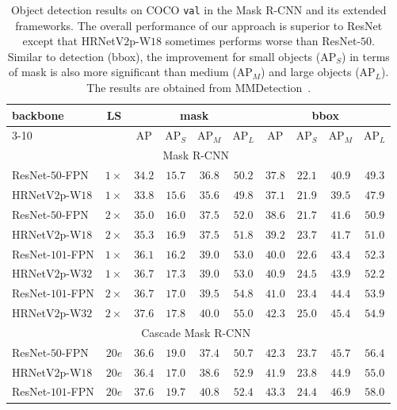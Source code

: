 \documentclass[10pt,journal,compsoc]{IEEEtran}
\begin{document}
\renewcommand{\arraystretch}{1.3}
	\begin{table}[t]
	\setlength{\tabcolsep}{2.3pt}
	\centering
	\caption{
	Object detection results on COCO \texttt{val}
	in the Mask R-CNN and its extended frameworks.
	{
	The overall performance 
	of our approach is superior to 
	ResNet except that
	HRNetV$2$p-W$18$ sometimes performs worse than ResNet-$50$.
	Similar to detection (bbox), 
	the improvement for small objects (AP$_S$) in terms of mask
	is also more significant than medium
	(AP$_M$)
	and large objects (AP$_L$).}
	The results are obtained from MMDetection~\cite{mmdetection}.}
	\label{tab:object_detection_maskrcnn}
	\scriptsize
	\vspace{-.3cm}
	\begin{tabular}{l|c|cccc|cccc}
		\hline %
		\multirow{2}{*}{backbone} & 
		\multirow{2}{*}{LS} & \multicolumn{4}{c|}{mask} & \multicolumn{4}{c}{bbox} \\
		\cline{3-10}&  & AP & AP$_S$ & AP$_M$ & AP$_L$ & AP & AP$_S$ & AP$_M$ & AP$_L$ \\
		\hline
		\multicolumn{10}{c}{Mask R-CNN~\cite{HeGDG17}}\\
		\hline

		\hline
	    ResNet-$50$-FPN & $1\times$  & $34.2$ & $15.7$ & $36.8$ & $50.2$ & $37.8$ & $22.1$ & $40.9$ & $49.3$  \\
		HRNetV$2$p-W$18$ & $1\times$ & $33.8$ & $15.6$ & $35.6$ & $49.8$ & $37.1$ & $21.9$ & $39.5$ & $47.9$  \\
	    ResNet-$50$-FPN & $2\times$  & $35.0$ & $16.0$ & ${37.5}$ & ${52.0}$ & $38.6$ & $21.7$ & $41.6$ & $50.9$  \\
		HRNetV$2$p-W$18$ & $2\times$ & ${35.3}$ & ${16.9}$ & ${37.5}$ & $51.8$ & ${39.2}$ & ${23.7}$ & ${41.7}$ & ${51.0}$  \\
	    \hline
		ResNet-$101$-FPN & $1\times$ & $36.1$ & $16.2$ & $39.0$ & $53.0$ & $40.0$ & $22.6$ & $43.4$ & $52.3$  \\
		HRNetV$2$p-W$32$ & $1\times$ & $36.7$ & $17.3$ & $39.0$ & $53.0$ & $40.9$ & $24.5$ & $43.9$ & $52.2$  \\
		ResNet-$101$-FPN & $2\times$ & $36.7$ & $17.0$ & $39.5$ & $54.8$ & $41.0$ & $23.4$ & $44.4$ & $53.9$  \\
		HRNetV$2$p-W$32$ & $2\times$ & ${37.6}$ & ${17.8}$ & ${40.0}$ & ${55.0}$ & ${42.3}$ & ${25.0}$ & ${45.4}$ & ${54.9}$ \\
		\hline
		\multicolumn{10}{c}{Cascade Mask R-CNN~\cite{CaiV19}}\\
		\hline
	    ResNet-$50$-FPN & $20e$  & ${36.6}$ & ${19.0}$ & $37.4$ & $50.7$ & ${42.3}$ & $23.7$ & ${45.7}$ & ${56.4}$  \\
		HRNetV$2$p-W$18$ & $20e$ & $36.4$ & $17.0$ & ${38.6}$ & ${52.9}$ & $41.9$ & ${23.8}$ & $44.9$ & $55.0$  \\
		\hline
	    ResNet-$101$-FPN & $20e$  & $37.6$ & ${19.7}$ & $40.8$ & $52.4$ & $43.3$ & $24.4$ & $46.9$ & $58.0$  \\
	    

\end{tabular}
\end{table}
\end{document}
